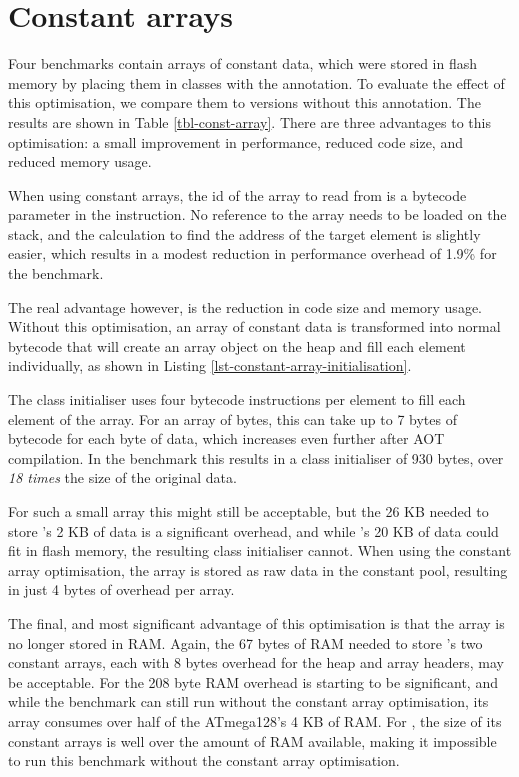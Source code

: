 \section{Constant arrays}
\label{sec-evaluation-const-array}


Four benchmarks contain arrays of constant data, which were stored in flash memory by placing them in classes with the  annotation. To evaluate the effect of this optimisation, we compare them to versions without this annotation. The results are shown in Table \ref{tbl-const-array}. There are three advantages to this optimisation: a small improvement in performance, reduced code size, and reduced memory usage.

When using constant arrays, the id of the array to read from is a bytecode parameter in the  instruction. No reference to the array needs to be loaded on the stack, and the calculation to find the address of the target element is slightly easier, which results in a modest reduction in performance overhead of 1.9\% for the  benchmark.

The real advantage however, is the reduction in code size and memory usage. Without this optimisation, an array of constant data is transformed into normal bytecode that will create an array object on the heap and fill each element individually, as shown in Listing \ref{lst-constant-array-initialisation}.

The class initialiser uses four bytecode instructions per element to fill each element of the array. For an array of bytes, this can take up to 7 bytes of bytecode for each byte of data, which increases even further after AOT compilation. In the  benchmark this results in a class initialiser of 930 bytes, over \emph{18 times} the size of the original data. 

For such a small array this might still be acceptable, but the 26 KB needed to store 's 2 KB of data is a significant overhead, and while 's 20 KB of data could fit in flash memory, the resulting class initialiser cannot. When using the constant array optimisation, the array is stored as raw data in the constant pool, resulting in just 4 bytes of overhead per array.

The final, and most significant advantage of this optimisation is that the array is no longer stored in RAM. Again, the 67 bytes of RAM needed to store 's two constant arrays, each with 8 bytes overhead for the heap and array headers, may be acceptable. For  the 208 byte RAM overhead is starting to be significant, and while the  benchmark can still run without the constant array optimisation, its array consumes over half of the ATmega128's 4 KB of RAM. For , the size of its constant arrays is well over the amount of RAM available, making it impossible to run this benchmark without the constant array optimisation.